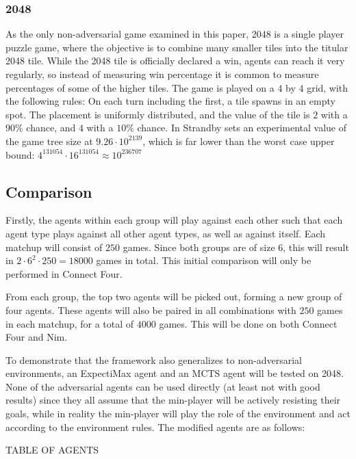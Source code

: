 \subsubsection{2048}
As the only non-adversarial game examined in this paper, 2048 is a single player puzzle game, where the objective is to combine many smaller tiles into the titular 2048 tile. While the 2048 tile is officially declared a win, agents can reach it very regularly, so instead of measuring win percentage it is common to measure percentages of some of the higher tiles. \revise The game is played on a $4$ by $4$ grid, with the following rules: On each turn including the first, a tile spawns in an empty spot. The placement is uniformly distributed, and the value of the tile is $2$ with a $90\%$ chance, and $4$ with a $10\%$ chance. In \needcit Strandby sets an experimental value of the game tree size at $9.26 \cdot 10^{2139}$, which is far lower than the worst case upper bound: $4^{131054}\cdot 16^{131054} \approx 10^{236707}$

\subsection{Comparison}
Firstly, the agents within each group will play against each other
such that each agent type plays against all other agent types, as well
as against itself. Each matchup will consist of $250$ games. Since both groups are of size 6, this will result in $2 \cdot 6^2 \cdot 250 = 18000$ games in total. This initial comparison will only be performed in Connect Four.

From each group, the top two agents will be picked out, forming a new group of four agents. These agents will also be paired in all combinations with $250$ games in each matchup, for a total of $4000$ games. This will be done on both 
Connect Four and Nim.

To demonstrate that the framework also generalizes to non-adversarial environments, an ExpectiMax agent and an MCTS agent will be tested on 2048. None of the adversarial agents can be used directly (at least not with good results) since they all assume that the min-player will be actively resisting their goals, while in reality the min-player will play the role of the environment and act according to the environment rules. The modified agents are as follows:

\todo TABLE OF AGENTS
